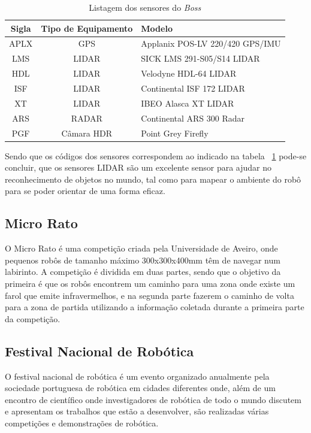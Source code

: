 \begin{table}
\begin{center}
\begin{tabular} { c c l }
	Sigla & Tipo de Equipamento & Modelo \\
	\hline
	APLX & GPS & Applanix POS-LV 220/420 GPS/IMU \\
	LMS & LIDAR & SICK LMS 291-S05/S14 LIDAR \\
	HDL & LIDAR & Velodyne HDL-64 LIDAR \\
	ISF & LIDAR & Continental ISF 172 LIDAR \\
	XT & LIDAR & IBEO Alasca XT LIDAR \\
	ARS & RADAR & Continental ARS 300 Radar \\
	PGF & Câmara HDR & Point Grey Firefly \\
	\hline
\end{tabular}
	\caption{Listagem dos sensores do \emph{Boss}}
	\label{boss_sensor}
\end{center}
\end{table}

Sendo que os códigos dos sensores correspondem ao indicado na tabela ~\ref{boss_sensor} pode-se concluir, que os sensores LIDAR são um excelente sensor para ajudar no reconhecimento de objetos no mundo, tal como para mapear o ambiente do robô para se poder orientar de uma forma eficaz.


\subsection{Micro Rato}

O  Micro Rato é uma competição criada pela Universidade de Aveiro, onde pequenos robôs de tamanho máximo 300x300x400mm têm de navegar num labirinto. A competição é dividida em duas partes, sendo que o objetivo da primeira é que os robôs encontrem um caminho para uma zona onde existe um farol que emite infravermelhos, e na segunda parte fazerem o caminho de volta para a zona de partida utilizando a informação coletada durante a primeira parte da competição.


\subsection{Festival Nacional de Robótica}

O festival nacional de robótica é um evento organizado anualmente pela sociedade
portuguesa de robótica em cidades diferentes onde, além de um encontro de científico
onde investigadores de robótica de todo o mundo discutem e apresentam os trabalhos
que estão a desenvolver, são realizadas várias competições e demonstrações de robótica.

